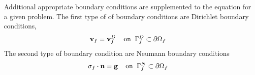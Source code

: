 Additional appropriate boundary conditions are supplemented to the equation for a given problem. The first type of of boundary conditions are Dirichlet boundary conditions, 
\begin{align}
\mathbf{v}_f = \mathbf{v}_f^D 
\hspace{4mm} \text{on} \hspace{2mm} \Gamma_f^D \subset \partial \Omega_f 
\end{align}
The second type of boundary condition are Neumann boundary conditions
\begin{align}
\sigma_f \cdot \mathbf{n} = \mathbf{g} 
\hspace{4mm} \text{on} \hspace{2mm} \Gamma_f^N \subset \partial \Omega_f 
\end{align}

